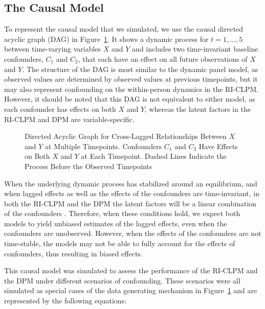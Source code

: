 \documentclass[
  a4paper,
  stu,
  floatsintext,
  donotrepeattitle]{apa7}
\begin{document}
\hypertarget{the-causal-model}{%
\subsection{The Causal Model}\label{the-causal-model}}

To represent the causal model that we simulated, we use the causal
directed acyclic graph (DAG) in Figure~\ref{fig-scm}. It shows a dynamic
process for \(t=1,...,5\) between time-varying variables \(X\) and \(Y\)
and includes two time-invariant baseline confounders, \(C_1\) and
\(C_2\), that each have an effect on all future observations of \(X\)
and \(Y\). The structure of the DAG is most similar to the dynamic panel
model, as observed values are determined by observed values at previous
timepoints, but it may also represent confounding on the within-person
dynamics in the RI-CLPM. However, it should be noted that this DAG is
not equivalent to either model, as each confounder has effects on both
\(X\) and \(Y\), whereas the latent factors in the RI-CLPM and DPM are
variable-specific.

\begin{figure}

\caption{\label{fig-scm}Directed Acyclic Graph for Cross-Lagged
Relationships Between \(X\) and \(Y\) at Multiple Timepoints.
Confounders \(C_1\) and \(C_2\) Have Effects on Both \(X\) and \(Y\) at
Each Timepoint. Dashed Lines Indicate the Process Before the Observed
Timepoints}

{\centering 



}

\end{figure}

When the underlying dynamic process has stabilized around an
equilibrium, and when lagged effects as well as the effects of the
confounders are time-invariant, in both the RI-CLPM and the DPM the
latent factors will be a linear combination of the confounders
\autocite{usami2019}. Therefore, when these conditions hold, we expect
both models to yield unbiased estimates of the lagged effects, even when
the confounders are unobserved. However, when the effects of the
confounders are not time-stable, the models may not be able to fully
account for the effects of confounders, thus resulting in biased
effects.

This causal model was simulated to assess the performance of the RI-CLPM
and the DPM under different scenarios of confounding. These scenarios
were all simulated as special cases of the data generating mechanism in
Figure~\ref{fig-scm} and are represented by the following equations:
\end{document}
